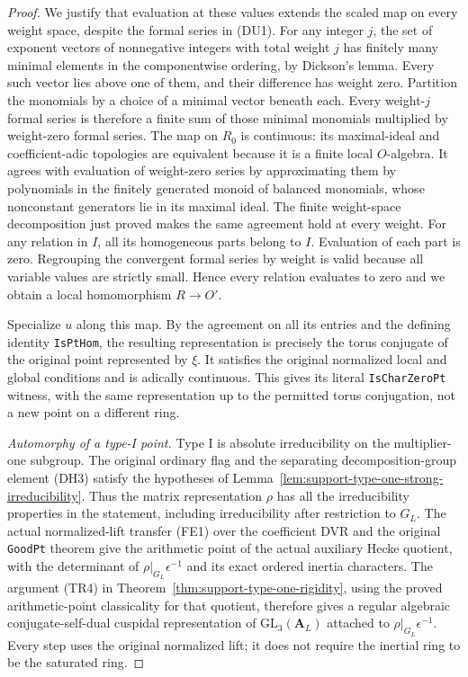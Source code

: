 \begin{proof}
We justify that evaluation at these values extends the scaled
map on every weight space, despite the formal series in (DU1).
For any integer $j$, the set of exponent vectors of
nonnegative integers with total weight $j$ has finitely many
minimal elements in the componentwise ordering, by Dickson's
lemma.  Every such vector lies above one of them, and their
difference has weight zero.  Partition the monomials by a
choice of a minimal vector beneath each.  Every weight-$j$
formal series is therefore a finite sum of those minimal
monomials multiplied by weight-zero formal series.
The map on $R_0$ is continuous: its maximal-ideal and
coefficient-adic topologies are equivalent because it is a
finite local $O$-algebra.  It agrees with evaluation of
weight-zero series by approximating them by polynomials in
the finitely generated monoid of balanced monomials, whose
nonconstant generators lie in its maximal ideal.
The finite weight-space decomposition just proved makes
the same agreement hold at every weight.  For any relation
in $I$, all its homogeneous parts belong to $I$.  Evaluation
of each part is zero.  Regrouping the convergent formal series
by weight is valid because all variable values are strictly
small.  Hence every relation evaluates to zero and we
obtain a local homomorphism $R\to O'$.

Specialize $u$ along this map.  By the agreement on all its
entries and the defining identity \texttt{IsPtHom}, the
resulting representation is precisely the torus conjugate
of the original point represented by $\xi$.
It satisfies the original normalized local and global
conditions and is adically continuous.  This gives its
literal \texttt{IsCharZeroPt} witness, with the same
representation up to the permitted torus conjugation,
not a new point on a different ring.

\emph{Automorphy of a type-I point.}
Type I is absolute irreducibility on the multiplier-one
subgroup.  The original ordinary flag and the separating
decomposition-group element (DH3) satisfy the hypotheses
of Lemma~\ref{lem:support-type-one-strong-irreducibility}.
Thus the matrix representation $\rho$ has all the
irreducibility properties in the statement, including
irreducibility after restriction to $G_L$.
The actual normalized-lift transfer (FE1) over the coefficient
DVR and the original \texttt{GoodPt} theorem give the
arithmetic point of the actual auxiliary Hecke quotient,
with the determinant of $\rho|_{G_L}\epsilon^{-1}$ and
its exact ordered inertia characters.
The argument (TR4) in
Theorem~\ref{thm:support-type-one-rigidity}, using the
proved arithmetic-point classicality for that quotient,
therefore gives a regular algebraic conjugate-self-dual
cuspidal representation of $\mathrm{GL}_3(\mathbf A_L)$
attached to $\rho|_{G_L}\epsilon^{-1}$.
Every step uses the original normalized lift; it does not
require the inertial ring to be the saturated ring.


\end{proof}
